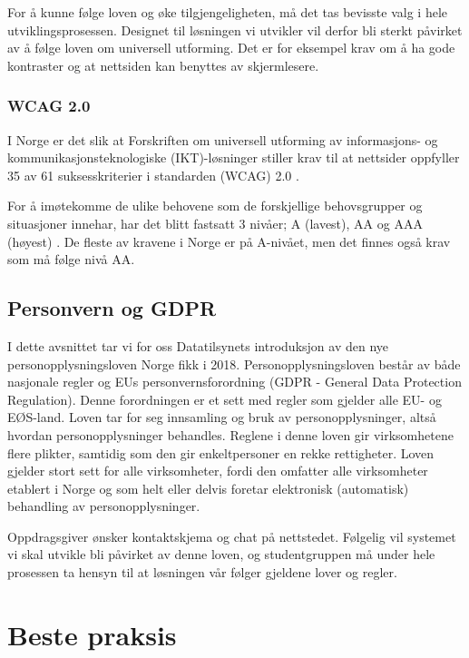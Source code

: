 For å kunne følge loven og øke tilgjengeligheten, må det tas bevisste valg i hele utviklingsprosessen. Designet til løsningen vi utvikler vil derfor bli sterkt påvirket av å følge loven om universell utforming. Det er for eksempel krav om å ha gode kontraster og at nettsiden kan benyttes av skjermlesere. 


\subsubsection{WCAG 2.0}

I Norge er det slik at Forskriften om universell utforming av informasjons- og kommunikasjonsteknologiske (IKT)-løsninger \cite{lovdata2013fou} stiller krav til at nettsider oppfyller 35 av 61 suksesskriterier i standarden  (WCAG) 2.0 \cite{difi2018wca}. 

For å imøtekomme de ulike behovene som de forskjellige behovsgrupper og situasjoner innehar, har det blitt fastsatt 3 nivåer; A (lavest), AA og AAA (høyest) \cite{w3c2008wca}. De fleste av kravene i Norge er på A-nivået, men det finnes også krav som må følge nivå AA.

\subsection{Personvern og GDPR}
I dette avsnittet tar vi for oss Datatilsynets \cite{data2018opm} introduksjon av den nye personopplysningsloven Norge fikk i 2018. Personopplysningsloven består av både nasjonale regler og EUs personvernsforordning (GDPR - General Data Protection Regulation). Denne forordningen er et sett med regler som gjelder alle EU- og EØS-land. Loven tar for seg innsamling og bruk av personopplysninger, altså hvordan personopplysninger behandles. Reglene i denne loven gir virksomhetene flere plikter, samtidig som den gir enkeltpersoner en rekke rettigheter. Loven gjelder stort sett for alle virksomheter, fordi den omfatter alle virksomheter etablert i Norge og som helt eller delvis foretar elektronisk (automatisk) behandling av personopplysninger. 

Oppdragsgiver ønsker kontaktskjema og chat på nettstedet. Følgelig vil systemet vi skal utvikle bli påvirket av denne loven, og studentgruppen må under hele prosessen ta hensyn til at løsningen vår følger gjeldene lover og regler.

\section{Beste praksis}

